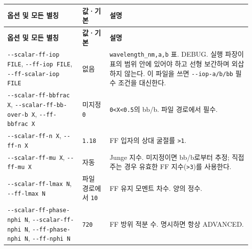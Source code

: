 {\TableFont
\begin{longtable}{@{}>{\raggedright\arraybackslash}p{}>{\raggedright\arraybackslash}p{}>{\raggedright\arraybackslash}p{}@{}}
\toprule
\textbf{옵션 및 모든 별칭} & \textbf{값·기본} & \textbf{설명} \\
\midrule
\endfirsthead
\toprule
\textbf{옵션 및 모든 별칭} & \textbf{값·기본} & \textbf{설명} \\
\midrule
\endhead
\bottomrule
\endfoot
\texttt{-\allowbreak{}-\allowbreak{}scalar-\allowbreak{}ff-\allowbreak{}iop FILE}, \texttt{-\allowbreak{}-\allowbreak{}ff-\allowbreak{}iop FILE}, \texttt{-\allowbreak{}-\allowbreak{}ff-\allowbreak{}scalar-\allowbreak{}iop FILE} & 없음 & \texttt{wavelength\_\allowbreak{}nm,\allowbreak{}a,\allowbreak{}b} 표. DEBUG. 실행 파장이 표의 범위 안에 있어야 하고 선형 보간하며 외삽하지 않는다. 이 파일을 쓰면 \texttt{-\allowbreak{}-\allowbreak{}iop-\allowbreak{}a/\allowbreak{}b/\allowbreak{}bb} 필수 조건을 대신한다. \\
\texttt{-\allowbreak{}-\allowbreak{}scalar-\allowbreak{}ff-\allowbreak{}bbfrac X}, \texttt{-\allowbreak{}-\allowbreak{}scalar-\allowbreak{}ff-\allowbreak{}bb-\allowbreak{}over-\allowbreak{}b X}, \texttt{-\allowbreak{}-\allowbreak{}ff-\allowbreak{}bbfrac X} & 미지정 \texttt{0} & \texttt{0<X<0.\allowbreak{}5}의 bb/b. 파일 경로에서 필수. \\
\texttt{-\allowbreak{}-\allowbreak{}scalar-\allowbreak{}ff-\allowbreak{}n X}, \texttt{-\allowbreak{}-\allowbreak{}ff-\allowbreak{}n X} & \texttt{1.\allowbreak{}18} & FF 입자의 상대 굴절률 \texttt{>1}. \\
\texttt{-\allowbreak{}-\allowbreak{}scalar-\allowbreak{}ff-\allowbreak{}mu X}, \texttt{-\allowbreak{}-\allowbreak{}ff-\allowbreak{}mu X} & 자동 & Junge 지수. 미지정이면 bb/b로부터 추정; 직접 주는 경우 유효한 FF 지수(\texttt{>3})를 사용한다. \\
\texttt{-\allowbreak{}-\allowbreak{}scalar-\allowbreak{}ff-\allowbreak{}lmax N}, \texttt{-\allowbreak{}-\allowbreak{}ff-\allowbreak{}lmax N} & 파일 경로에서 \texttt{10} & FF 유지 모멘트 차수. 양의 정수. \\
\texttt{-\allowbreak{}-\allowbreak{}scalar-\allowbreak{}ff-\allowbreak{}phase-\allowbreak{}nphi N}, \texttt{-\allowbreak{}-\allowbreak{}scalar-\allowbreak{}ff-\allowbreak{}nphi N}, \texttt{-\allowbreak{}-\allowbreak{}ff-\allowbreak{}phase-\allowbreak{}nphi N}, \texttt{-\allowbreak{}-\allowbreak{}ff-\allowbreak{}nphi N} & \texttt{720} & FF 방위 적분 수. 명시하면 항상 ADVANCED. \\
\end{longtable}
}


